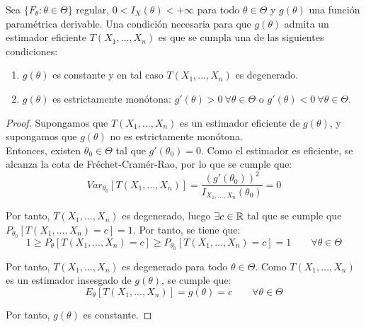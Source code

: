 \begin{lema}
    Sea $\{F_\theta : \theta \in \Theta\}$ regular, $0 < I_X(\theta) < +\infty$ para todo $\theta \in \Theta$ y $g(\theta)$ una función paramétrica derivable. Una condición necesaria para que $g(\theta)$ admita un estimador eficiente $T(X_1, \ldots, X_n)$ es que se cumpla una de las siguientes condiciones:
    \begin{enumerate}
        \item $g(\theta)$ es constante y en tal caso $T(X_1, \ldots, X_n)$ es degenerado.
        \item $g(\theta)$ es estrictamente monótona: $g'(\theta) > 0\ \forall \theta \in \Theta$ o $g'(\theta) < 0\ \forall \theta \in \Theta$.
    \end{enumerate}
    \begin{proof}
        Supongamos que $T(X_1, \ldots, X_n)$ es un estimador eficiente de $g(\theta)$, y supongamos que $g(\theta)$ no es estrictamente monótona.\\

        Entonces, existen $\theta_0\in \Theta$ tal que $g'(\theta_0)=0$. Como el estimador es eficiente, se alcanza la cota de Fréchet-Cramér-Rao, por lo que se cumple que:
        \begin{equation*}
            Var_{\theta_0}[T(X_1, \ldots, X_n)] = \dfrac{(g'(\theta_0))^2}{I_{X_1, \ldots, X_n}(\theta_0)} = 0
        \end{equation*}

        Por tanto, $T(X_1, \ldots, X_n)$ es degenerado, luego $\exists c \in \mathbb{R}$ tal que se cumple que $P_{\theta_0}[T(X_1, \ldots, X_n) = c] = 1$. Por tanto, se tiene que:
        \begin{equation*}
            1\geq P_{\theta}[T(X_1, \ldots, X_n) = c] \geq P_{\theta_0}[T(X_1, \ldots, X_n) = c] = 1\qquad \forall \theta \in \Theta
        \end{equation*}
        
        Por tanto, $T(X_1, \ldots, X_n)$ es degenerado para todo $\theta \in \Theta$. Como $T(X_1, \ldots, X_n)$ es un estimador insesgado de $g(\theta)$, se cumple que:
        \begin{equation*}
            E_\theta[T(X_1, \ldots, X_n)] = g(\theta) = c\qquad \forall \theta \in \Theta
        \end{equation*}

        Por tanto, $g(\theta)$ es constante.
    \end{proof}
\end{lema}



